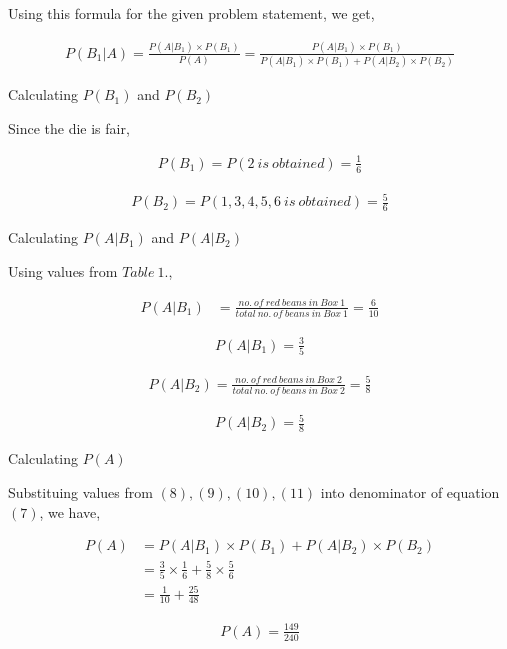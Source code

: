 \documentclass[a4paper]{report}
\begin{document}
Using this formula for the given problem statement, we get,

\begin{align}
    P(B_1|A)=\frac{P(A|B_1)\times P(B_1)}{P(A)}=\frac{P(A|B_1)\times P(B_1)}{P(A|B_1)\times P(B_1)+P(A|B_2)\times P(B_2)}
\end{align}


Calculating $P(B_1)$ and $P(B_2)$

Since the die is fair, 

\begin{align}
    P(B_1)=P(2\ is\ obtained)=\frac{1}{6}
\end{align}

\begin{align}
    P(B_2)=P(1,3,4,5,6\ is\ obtained)=\frac{5}{6}
\end{align}



Calculating $P(A|B_1)$ and $P(A|B_2)$

Using values from $Table\ 1.$, 

\begin{align*}
    P(A|B_1)&=\frac{no.\ of\ red\ beans\ in\ Box\ 1}{total\ no.\ of\ beans\ in\ Box\ 1}=\frac{6}{10}
\end{align*}

\begin{align}
    P(A|B_1)=\frac{3}{5}
\end{align}


\begin{align*}
    P(A|B_2)=\frac{no.\ of\ red\ beans\ in\ Box\ 2}{total\ no.\ of\ beans\ in\ Box\ 2}=\frac{5}{8}
\end{align*}

\begin{align}
    P(A|B_2)=\frac{5}{8}
\end{align}

Calculating $P(A)$

Substituing values from $(8), (9),(10),(11)$ into denominator of equation $(7)$, we have,

\begin{align*}
    P(A)&=P(A|B_1)\times P(B_1)+P(A|B_2)\times P(B_2) \\
    &=\frac{3}{5}\times \frac{1}{6} + \frac{5}{8}\times \frac{5}{6} \\
    &=\frac{1}{10}+\frac{25}{48}
\end{align*}

\begin{align}
    P(A)=\frac{149}{240}
\end{align}
\end{document}
